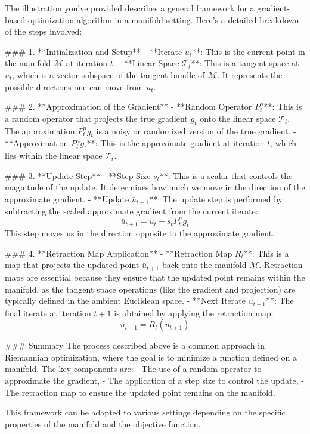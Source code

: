 The illustration you've provided describes a general framework for a gradient-based optimization algorithm in a manifold setting. Here's a detailed breakdown of the steps involved:

### 1. **Initialization and Setup**
- **Iterate \( u_t \)**: This is the current point in the manifold \(\mathcal{M}\) at iteration \( t \).
- **Linear Space \(\mathcal{T}_t\)**: This is a tangent space at \( u_t \), which is a vector subspace of the tangent bundle of \(\mathcal{M}\). It represents the possible directions one can move from \( u_t \).

### 2. **Approximation of the Gradient**
- **Random Operator \( P_t^n \)**: This is a random operator that projects the true gradient \( g_t \) onto the linear space \(\mathcal{T}_t\). The approximation \( P_t^n g_t \) is a noisy or randomized version of the true gradient.
- **Approximation \( P_t^n g_t \)**: This is the approximate gradient at iteration \( t \), which lies within the linear space \(\mathcal{T}_t\).

### 3. **Update Step**
- **Step Size \( s_t \)**: This is a scalar that controls the magnitude of the update. It determines how much we move in the direction of the approximate gradient.
- **Update \(\bar{u}_{t+1}\)**: The update step is performed by subtracting the scaled approximate gradient from the current iterate:
  \[
  \bar{u}_{t+1} = u_t - s_t P_t^n g_t
  \]
  This step moves us in the direction opposite to the approximate gradient.

### 4. **Retraction Map Application**
- **Retraction Map \( R_t \)**: This is a map that projects the updated point \(\bar{u}_{t+1}\) back onto the manifold \(\mathcal{M}\). Retraction maps are essential because they ensure that the updated point remains within the manifold, as the tangent space operations (like the gradient and projection) are typically defined in the ambient Euclidean space.
- **Next Iterate \( u_{t+1} \)**: The final iterate at iteration \( t+1 \) is obtained by applying the retraction map:
  \[
  u_{t+1} = R_t(\bar{u}_{t+1})
  \]

### Summary
The process described above is a common approach in Riemannian optimization, where the goal is to minimize a function defined on a manifold. The key components are:
- The use of a random operator to approximate the gradient,
- The application of a step size to control the update,
- The retraction map to ensure the updated point remains on the manifold.

This framework can be adapted to various settings depending on the specific properties of the manifold and the objective function.
